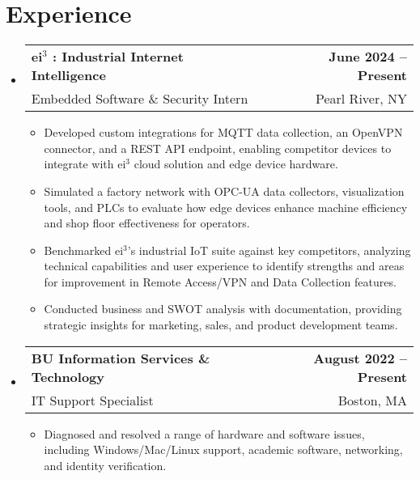 \documentclass[letterpaper,11pt]{article}
\makeatletter
\newcommand{\resumeItem}[1]{
  \item\small{
    {#1 \vspace{-2pt}}
  }
}
\newcommand{\resumeSubheading}[4]{
  \vspace{-2pt}\item
    \begin{tabular*}{1.0\textwidth}[t]{l@{\extracolsep{\fill}}r}
      \textbf{#1} & \textbf{\small #2} \\
        {\small#3} & {\small #4} \\
    \end{tabular*}\vspace{-7pt}
}
\newcommand{\resumeSubHeadingListStart}{\begin{itemize}[leftmargin=0.0in, label={}]}
\newcommand{\resumeSubHeadingListEnd}{\end{itemize}}
\newcommand{\resumeItemListStart}{\begin{itemize}}
\newcommand{\resumeItemListEnd}{\end{itemize}\vspace{-5pt}}
\makeatother
\begin{document}
\section{Experience}
  \resumeSubHeadingListStart

    \resumeSubheading
    {ei$^3$ : Industrial Internet Intelligence}{June 2024 -- Present}
    {Embedded Software \& Security Intern}{Pearl River, NY}
    \resumeItemListStart

    \resumeItem{Developed custom integrations for MQTT data collection, an OpenVPN connector, and a REST API endpoint, enabling competitor devices to integrate with ei$^3$ cloud solution and edge device hardware.}
    \resumeItem{Simulated a factory network with OPC-UA data collectors, visualization tools, and PLCs to evaluate how edge devices enhance machine efficiency and shop floor effectiveness for operators.}
    \resumeItem{Benchmarked ei$^3$'s industrial IoT suite against key competitors, analyzing technical capabilities and user experience to identify strengths and areas for improvement in Remote Access/VPN and Data Collection features.}
    \resumeItem{Conducted business and SWOT analysis with documentation, providing strategic insights for marketing, sales, and product development teams.}


    \resumeItemListEnd


    \resumeSubheading
      {BU Information Services \& Technology}{August 2022 -- Present}
      {IT Support Specialist}{Boston, MA}
      \resumeItemListStart
        \resumeItem{Diagnosed and resolved a range of hardware and software issues, including Windows/Mac/Linux support, academic software, networking, and identity verification.}

      \resumeItemListEnd


    
  \resumeSubHeadingListEnd
\vspace{-16pt}
\end{document}

